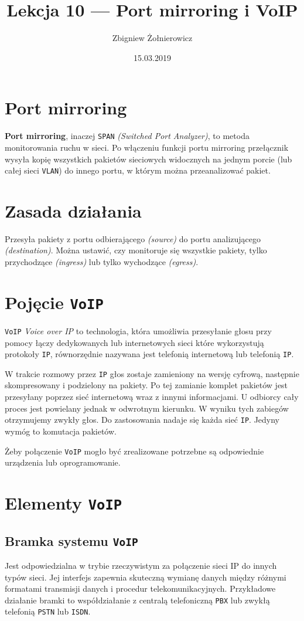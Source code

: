 \documentclass[a4paper]{article}
\begin{document}
\title{Lekcja 10 --- Port mirroring i VoIP}
\author{Zbigniew Żołnierowicz}
\date{15.03.2019}
\maketitle
\section{Port mirroring}
\textbf{Port mirroring}, inaczej {\tt SPAN} \emph{(Switched Port Analyzer)},
to metoda monitorowania ruchu w sieci. Po włączeniu funkcji portu mirroring
przełącznik wysyła kopię wszystkich pakietów sieciowych widocznych na jednym porcie
(lub całej sieci {\tt VLAN}) do innego portu, w którym można przeanalizować pakiet.
\section{Zasada działania}
Przesyła pakiety z portu odbierającego \emph{(source)} do portu analizującego
\emph{(destination)}. Można ustawić, czy monitoruje się
wszystkie pakiety, tylko przychodzące \emph{(ingress)} lub
tylko wychodzące \emph{(egress)}.
\section{Pojęcie {\tt VoIP}}
{\tt VoIP} \emph{Voice over IP} to technologia, która umożliwia przesyłanie głosu przy pomocy
łączy dedykowanych lub internetowych sieci które wykorzystują protokoły {\tt IP},
równorzędnie nazywana jest telefonią internetową lub telefonią {\tt IP}.

W trakcie rozmowy przez {\tt IP} głos zostaje zamieniony na wersję cyfrową,
następnie skompresowany i podzielony na pakiety. Po tej zamianie komplet
pakietów jest przesyłany poprzez sieć internetową wraz z innymi informacjami.
U odbiorcy cały proces jest powielany jednak w odwrotnym kierunku. W wyniku
tych zabiegów otrzymujemy zwykły głos. Do zastosowania nadaje się każda sieć {\tt IP}.
Jedyny wymóg to komutacja pakietów.

Żeby połączenie {\tt VoIP} mogło być zrealizowane potrzebne są odpowiednie
urządzenia lub oprogramowanie.
\pagebreak
\section{Elementy {\tt VoIP}}
\subsection{Bramka systemu {\tt VoIP}}
Jest odpowiedzialna w trybie rzeczywistym za połączenie sieci IP do innych typów sieci.
Jej interfejs zapewnia skuteczną wymianę danych między różnymi formatami
transmisji danych i procedur telekomunikacyjnych. Przykładowe działanie bramki
to współdziałanie z centralą telefoniczną {\tt PBX}
lub zwykłą telefonią {\tt PSTN} lub {\tt ISDN}.
\end{document}
